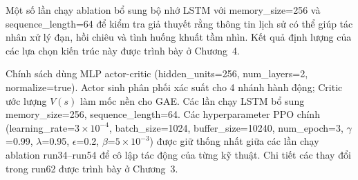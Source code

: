 Một số lần chạy ablation bổ sung bộ nhớ LSTM với memory\_size=256 và sequence\_length=64 để kiểm tra giả thuyết rằng thông tin lịch sử có thể giúp tác nhân xử lý đạn, hồi chiêu và tình huống khuất tầm nhìn. Kết quả định lượng của các lựa chọn kiến trúc này được trình bày ở Chương~4.

Chính sách dùng MLP actor-critic (hidden\_units=256, num\_layers=2, normalize=true). Actor sinh phân phối xác suất cho 4 nhánh hành động; Critic ước lượng $V(s)$ làm mốc nền cho GAE. Các lần chạy LSTM bổ sung memory\_size=256, sequence\_length=64. Các hyperparameter PPO chính (learning\_rate=$3\times10^{-4}$, batch\_size=1024, buffer\_size=10240, num\_epoch=3, $\gamma$=0.99, $\lambda$=0.95, $\epsilon$=0.2, $\beta$=$5\times10^{-3}$) được giữ thống nhất giữa các lần chạy ablation run34--run54 để cô lập tác động của từng kỹ thuật. Chi tiết các thay đổi trong run62 được trình bày ở Chương~3.
